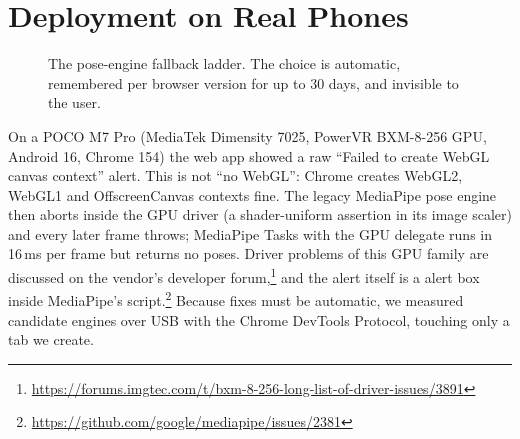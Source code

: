 \section{Deployment on Real Phones}\label{sec:deploy}
\begin{figure}[t]
\centering
\resizebox{0.48\textwidth}{!}{}
\caption{The pose-engine fallback ladder. The choice is automatic, remembered per browser version for up to 30 days, and invisible to the user.}
\label{fig:ladder}
\end{figure}
 On a POCO M7 Pro (MediaTek Dimensity 7025, PowerVR BXM-8-256 GPU, Android 16, Chrome 154) the web app showed a raw ``Failed to create WebGL canvas context'' alert. This is not ``no WebGL'': Chrome creates WebGL2, WebGL1 and OffscreenCanvas contexts fine. The legacy MediaPipe pose engine then aborts inside the GPU driver (a shader-uniform assertion in its image scaler) and every later frame throws; MediaPipe Tasks with the GPU delegate runs in 16\,ms per frame but returns no poses. Driver problems of this GPU family are discussed on the vendor's developer forum,\footnote{\url{https://forums.imgtec.com/t/bxm-8-256-long-list-of-driver-issues/3891}} and the alert itself is a alert box inside MediaPipe's script.\footnote{\url{https://github.com/google/mediapipe/issues/2381}} Because fixes must be automatic, we measured candidate engines over USB with the Chrome DevTools Protocol, touching only a tab we create.

